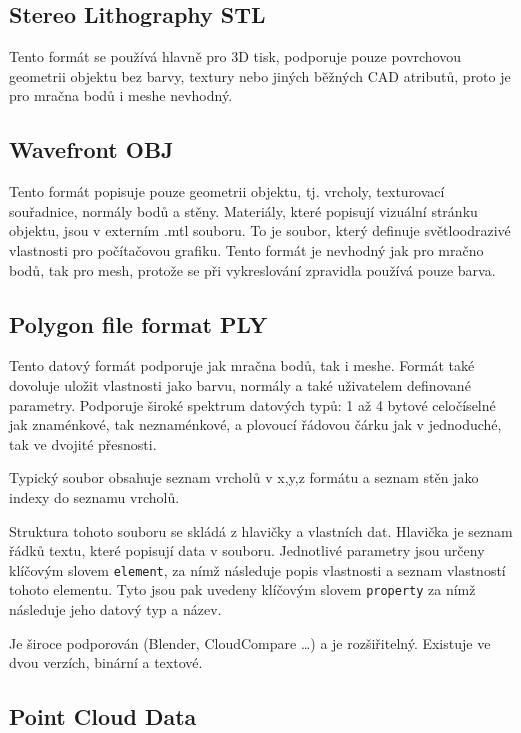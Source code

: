 \subsection{Stereo Lithography STL}

Tento formát se používá hlavně pro 3D tisk, podporuje pouze povrchovou geometrii objektu bez barvy, textury nebo jiných běžných CAD atributů, proto je pro mračna bodů i meshe nevhodný.

\subsection{Wavefront OBJ}

Tento formát popisuje pouze geometrii objektu, tj. vrcholy, texturovací souřadnice, normály bodů a stěny. Materiály, které popisují vizuální stránku objektu, jsou v externím .mtl souboru. To je soubor, který definuje světloodrazivé vlastnosti pro počítačovou grafiku. Tento formát je nevhodný jak pro mračno bodů, tak pro mesh, protože se při vykreslování zpravidla používá pouze barva.

\subsection{Polygon file format PLY}

Tento datový formát podporuje jak mračna bodů, tak i meshe. Formát také dovoluje uložit vlastnosti jako barvu, normály a také uživatelem definované parametry. Podporuje široké spektrum datových typů: 1 až 4 bytové celočíselné jak znaménkové, tak neznaménkové, a plovoucí řádovou čárku jak v jednoduché, tak ve dvojité přesnosti.

Typický soubor obsahuje seznam vrcholů v x,y,z formátu a seznam stěn jako indexy do seznamu vrcholů.

Struktura tohoto souboru se skládá z hlavičky a vlastních dat.
Hlavička je seznam řádků textu, které popisují data v souboru. Jednotlivé parametry jsou určeny klíčovým slovem \texttt{element}, za nímž následuje popis vlastnosti a seznam vlastností tohoto elementu. Tyto jsou pak uvedeny klíčovým slovem \texttt{property} za nímž následuje jeho datový typ a název.

Je široce podporován (Blender, CloudCompare \dots) a je rozšiřitelný. Existuje ve dvou verzích, binární a textové.\cite{ply_format}

\subsection{Point Cloud Data}

